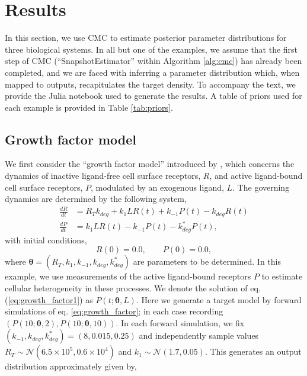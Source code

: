 \section{Results}\label{sec:results}
In this section, we use CMC to estimate posterior parameter distributions for three biological systems. In all but one of the examples, we assume that the first step of CMC (``SnapshotEstimator'' within Algorithm \ref{alg:cmc}) has already been completed, and we are faced with inferring a parameter distribution which, when mapped to outputs, recapitulates the target density. To accompany the text, we provide the Julia notebook used to generate the results. A table of priors used for each example is provided in Table \ref{tab:priors}.


\subsection{Growth factor model}
We first consider the ``growth factor model'' introduced by \cite{dixit2018maximum}, which concerns the dynamics of inactive ligand-free cell surface receptors, $R$, and active ligand-bound cell surface receptors, $P$, modulated by an exogenous ligand, $L$. The governing dynamics are determined by the following system,
%
\begin{align}\label{eq:growth_factor}
\frac{dR}{dt} &= R_T k_{deg} + k_1 L R(t) + k_{-1} P(t) - k_{deg} R(t)\\
\label{eq:growth_factor1}
\frac{dP}{dt} &= k_1 L R(t) - k_{-1} P(t) - k^*_{deg} P(t),
\end{align}
with initial conditions,
\begin{equation*}
R(0) = 0.0, \qquad P(0) = 0.0,
\end{equation*}
%
where $\boldsymbol{\theta}=(R_T, k_1, k_{-1}, k_{deg}, k^*_{deg})$ are parameters to be determined. In this example, we use measurements of the active ligand-bound receptors $P$ to estimate cellular heterogeneity in these processes. We denote the solution of eq. (\ref{eq:growth_factor1}) as $P(t; \boldsymbol{\theta}, L)$. Here we generate a target model by forward simulations of eq. \eqref{eq:growth_factor}; in each case recording $(P(10; \boldsymbol{\theta}, 2), P(10; \boldsymbol{\theta}, 10))$. In each forward simulation, we fix $(k_{-1}, k_{deg}, k^*_{deg}) = (8, 0.015, 0.25)$ and independently sample values ${R_T\sim \mathcal{N}(6.5\times 10^5, 0.6\times 10^4)}$ and ${k_1\sim \mathcal{N}(1.7, 0.05)}$. This generates an output distribution approximately given by,
%

